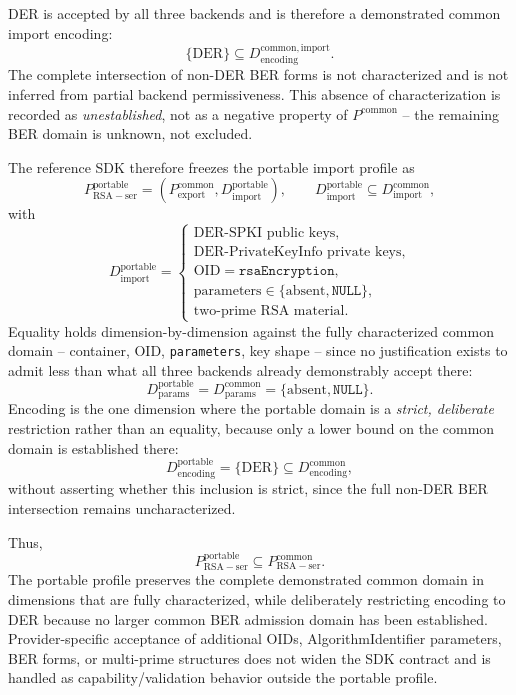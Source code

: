 \documentclass[11pt,a4paper]{article}
\begin{document}
DER is accepted by all three backends and is therefore a demonstrated
common import encoding:
\[
\{\mathrm{DER}\}
\subseteq
D_{\mathrm{encoding}}^{\mathrm{common,import}}.
\]
The complete intersection of non-DER BER forms is not characterized
and is not inferred from partial backend permissiveness. This absence
of characterization is recorded as \emph{unestablished}, not as a
negative property of $P^{\mathrm{common}}$ -- the remaining BER domain
is unknown, not excluded.

The reference SDK therefore freezes the portable import profile as
\[
P_{\mathrm{RSA-ser}}^{\mathrm{portable}}
=
\left(
P_{\mathrm{export}}^{\mathrm{common}},
D_{\mathrm{import}}^{\mathrm{portable}}
\right),
\qquad
D_{\mathrm{import}}^{\mathrm{portable}}
\subseteq
D_{\mathrm{import}}^{\mathrm{common}},
\]
with
\[
D_{\mathrm{import}}^{\mathrm{portable}}
=
\left\{
\begin{array}{l}
\text{DER-SPKI public keys},\\
\text{DER-PrivateKeyInfo private keys},\\
\mathrm{OID}=\texttt{rsaEncryption},\\
\mathrm{parameters}\in\{\mathrm{absent},\texttt{NULL}\},\\
\text{two-prime RSA material}.
\end{array}
\right.
\]
Equality holds dimension-by-dimension against the fully characterized
common domain -- container, OID, \texttt{parameters}, key shape --
since no justification exists to admit less than what all three
backends already demonstrably accept there:
\[
D_{\mathrm{params}}^{\mathrm{portable}}
=
D_{\mathrm{params}}^{\mathrm{common}}
=
\{\mathrm{absent},\texttt{NULL}\}.
\]
Encoding is the one dimension where the portable domain is a
\emph{strict, deliberate} restriction rather than an equality, because
only a lower bound on the common domain is established there:
\[
D_{\mathrm{encoding}}^{\mathrm{portable}}
=
\{\mathrm{DER}\}
\subseteq
D_{\mathrm{encoding}}^{\mathrm{common}},
\]
without asserting whether this inclusion is strict, since the full
non-DER BER intersection remains uncharacterized.

Thus,
\[
P_{\mathrm{RSA-ser}}^{\mathrm{portable}}
\subseteq
P_{\mathrm{RSA-ser}}^{\mathrm{common}}.
\]
The portable profile preserves the complete demonstrated common
domain in dimensions that are fully characterized, while deliberately
restricting encoding to DER because no larger common BER admission
domain has been established. Provider-specific acceptance of
additional OIDs, AlgorithmIdentifier parameters, BER forms, or
multi-prime structures does not widen the SDK contract and is handled
as capability/validation behavior outside the portable profile.
\end{document}
